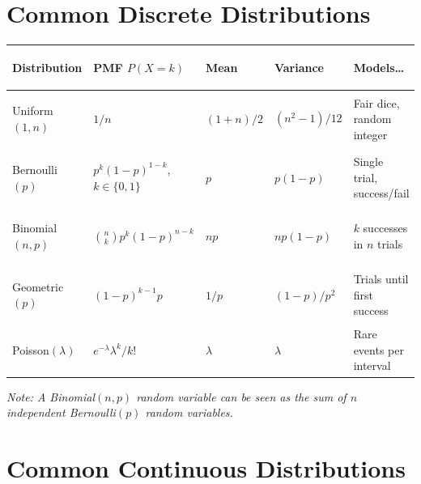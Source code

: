 \documentclass[11pt, letterpaper]{article}
\begin{document}
\section*{Common Discrete Distributions}

\noindent
{\small\renewcommand{\arraystretch}{1.7}
\begin{tabularx}{\textwidth}{>{\bfseries\raggedright\arraybackslash}p{2.8cm}
                              >{\raggedright\arraybackslash}p{4.2cm}
                              >{\centering\arraybackslash}p{1.6cm}
                              >{\centering\arraybackslash}p{1.6cm}
                              >{\raggedright\arraybackslash}X}
\toprule
\rowcolor{tableheadergreen}
\textbf{Distribution} & \textbf{PMF $P(X=k)$} & \textbf{Mean} & \textbf{Variance} & \textbf{Models\ldots} \\
\midrule
\rowcolor{rowA}  Uniform$(1,n)$   & $1/n$ & $(1+n)/2$ & $(n^2-1)/12$ & Fair dice, random integer \\
\rowcolor{rowBg} Bernoulli$(p)$   & $p^k(1-p)^{1-k}$, $k\in\{0,1\}$ & $p$ & $p(1-p)$ & Single trial, success/fail \\
\rowcolor{rowA}  Binomial$(n,p)$  & $\binom{n}{k}p^k(1-p)^{n-k}$ & $np$ & $np(1-p)$ & $k$ successes in $n$ trials \\
\rowcolor{rowBg} Geometric$(p)$   & $(1-p)^{k-1}p$ & $1/p$ & $(1-p)/p^2$ & Trials until first success \\
\rowcolor{rowA}  Poisson$(\lambda)$& $e^{-\lambda}\lambda^k/k!$ & $\lambda$ & $\lambda$ & Rare events per interval \\
\bottomrule
\end{tabularx}}

\vspace{4pt}
\textit{Note: A Binomial$(n,p)$ random variable can be seen as the sum of $n$ independent Bernoulli$(p)$ random variables.}

\section*{Common Continuous Distributions}
\end{document}
